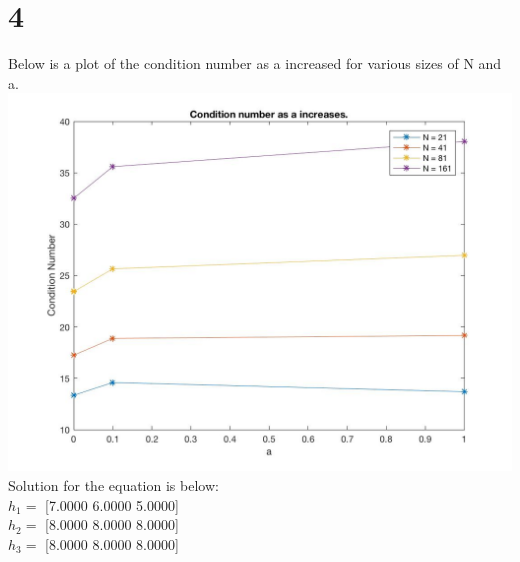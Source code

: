 \documentclass[10pt,a4paper]{article}
\begin{document}
\section*{4}

Below is a plot of the condition number as a increased for various sizes of N and a. \\

\includegraphics[scale=0.4]{condition_number.jpg} \\

Solution for the equation is below: \\
$ h_1 =  $ [7.0000    6.0000    5.0000] \\
$ h_2 =  $ [8.0000    8.0000    8.0000] \\
$ h_3 =  $ [8.0000    8.0000    8.0000]
\end{document}
